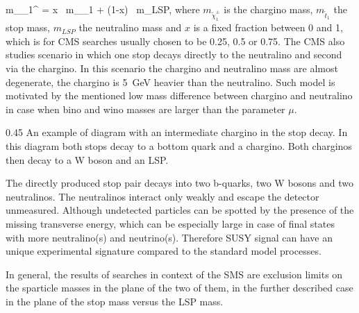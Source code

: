 {
m_{\tilde{\chi}_{1}^{\pm}} = x ~m_{_{1}} + (1-x) ~m_{LSP},
}
where $m_{\tilde{\chi}_{1}^{\pm}}$ is the chargino mass, $m_{\tilde{t}_{1}}$ the stop mass, $m_{LSP}$ the neutralino mass and $x$ is a fixed fraction between 0 and 1, which is for CMS searches usually chosen to be 0.25, 0.5 or 0.75. The CMS also studies scenario in which one stop decays directly to the neutralino and second via the chargino. In this scenario the chargino and neutralino mass are almost degenerate, the chargino is 5~GeV heavier than the neutralino. Such model is motivated by the mentioned low mass difference between chargino and neutralino in case when bino and wino masses are larger than the parameter $\mu$.

                 {0.45}       %
                 {An example of diagram with an intermediate chargino in the stop decay. In this diagram both stops decay to a bottom quark and a chargino. Both charginos then decay to a W boson and an LSP.   } %

The directly produced stop pair decays into two b-quarks, two W bosons and two neutralinos. The neutralinos interact only weakly and escape the detector unmeasured. Although undetected particles can be spotted by the presence of the missing transverse energy, which can be especially large in case of final states with more neutralino(s) and neutrino(s). Therefore SUSY signal can have an unique experimental signature compared to the standard model processes.

In general, the results of searches in context of the SMS are exclusion limits on the sparticle masses in the plane of the two of them, in the further described case in the plane of the stop mass versus the LSP mass.



